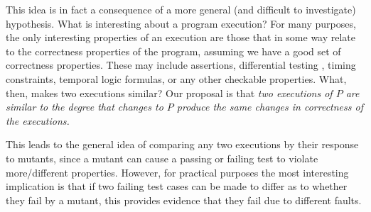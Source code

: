 This idea is in fact a consequence of a more general (and difficult to investigate) hypothesis.  What is interesting about a program execution?  For many purposes, the only interesting properties of an execution are those that in some way relate to the correctness properties of the program, assuming we have a good set of correctness properties.  These may include assertions, differential testing \cite{Differential,ICSEDiff}, timing constraints, temporal logic formulas, or any other checkable properties.  What, then, makes two executions similar?  Our proposal is that \emph{two executions of $P$ are similar to the degree that changes to $P$ produce the same changes in correctness of the executions.}

This leads to the general idea of comparing any two executions by their response to mutants, since a mutant can cause a passing or failing test to violate more/different properties.   However, for practical purposes the most interesting implication is that if two failing test cases can be made to differ as to whether they fail by a mutant, this provides evidence that they fail due to different faults.



